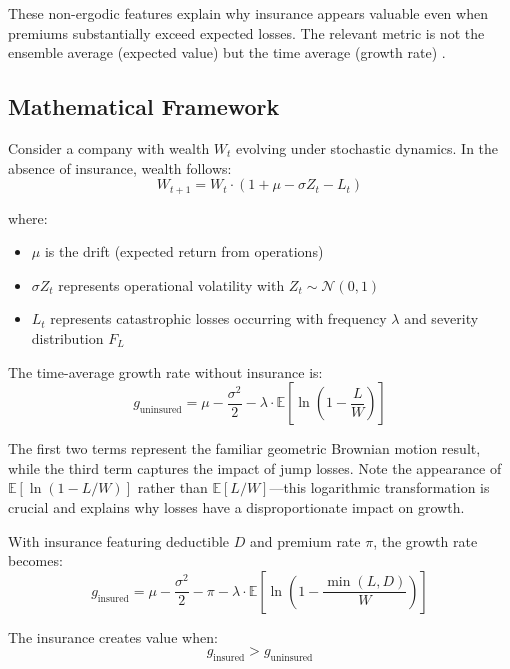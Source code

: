 \documentclass[11pt,letterpaper]{article}
\newcommand{\E}{\mathbb{E}}
\begin{document}
These non-ergodic features explain why insurance appears valuable even when premiums substantially exceed expected losses. The relevant metric is not the ensemble average (expected value) but the time average (growth rate) \citep{peters2011time}.

\subsection{Mathematical Framework}

Consider a company with wealth $W_t$ evolving under stochastic dynamics. In the absence of insurance, wealth follows:
\begin{equation}
W_{t+1} = W_t \cdot \left(1 + \mu - \sigma Z_t - L_t\right)
\end{equation}

where:
\begin{itemize}
    \item $\mu$ is the drift (expected return from operations)
    \item $\sigma Z_t$ represents operational volatility with $Z_t \sim \mathcal{N}(0,1)$
    \item $L_t$ represents catastrophic losses occurring with frequency $\lambda$ and severity distribution $F_L$
\end{itemize}

The time-average growth rate without insurance is:
\begin{equation}
g_{\text{uninsured}} = \mu - \frac{\sigma^2}{2} - \lambda \cdot \E\left[\ln\left(1 - \frac{L}{W}\right)\right]
\end{equation}

The first two terms represent the familiar geometric Brownian motion result, while the third term captures the impact of jump losses. Note the appearance of $\E[\ln(1 - L/W)]$ rather than $\E[L/W]$—this logarithmic transformation is crucial and explains why losses have a disproportionate impact on growth.

With insurance featuring deductible $D$ and premium rate $\pi$, the growth rate becomes:
\begin{equation}
g_{\text{insured}} = \mu - \frac{\sigma^2}{2} - \pi - \lambda \cdot \E\left[\ln\left(1 - \frac{\min(L, D)}{W}\right)\right]
\end{equation}

The insurance creates value when:
\begin{equation}
g_{\text{insured}} > g_{\text{uninsured}}
\end{equation}
\end{document}
